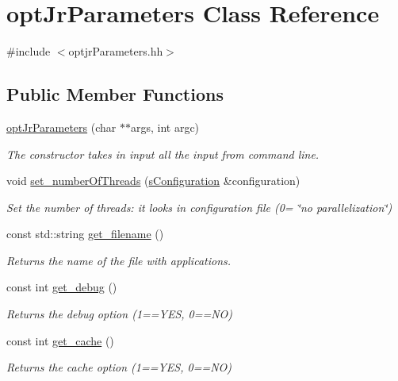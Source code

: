 \hypertarget{classoptJrParameters}{\section{opt\-Jr\-Parameters Class Reference}
\label{classoptJrParameters}
}


{\ttfamily \#include $<$optjr\-Parameters.\-hh$>$}

\subsection*{Public Member Functions}
\begin{DoxyCompactItemize}
\item 
\hyperlink{classoptJrParameters_a76f806d48141b4b4c7a215c2645011de}{opt\-Jr\-Parameters} (char $\ast$$\ast$args, int argc)
\begin{DoxyCompactList}\small\item\em The constructor takes in input all the input from command line. \end{DoxyCompactList}\item 
void \hyperlink{classoptJrParameters_a3747d78e5dd35b8b1aa1c037e9d91cf7}{set\-\_\-number\-Of\-Threads} (\hyperlink{readConfigurationFile_8hh_ab8f35b1da3261263c5e9c0e7c8921f5c}{s\-Configuration} \&configuration)
\begin{DoxyCompactList}\small\item\em Set the number of threads\-: it looks in configuration file (0= \char`\"{}no parallelization\char`\"{}) \end{DoxyCompactList}\item 
const std\-::string \hyperlink{classoptJrParameters_a8dcc738e721b3df88c2622712ed83414}{get\-\_\-filename} ()
\begin{DoxyCompactList}\small\item\em Returns the name of the file with applications. \end{DoxyCompactList}\item 
const int \hyperlink{classoptJrParameters_a64016f274261a7a7d74d8460bb7e2ee4}{get\-\_\-debug} ()
\begin{DoxyCompactList}\small\item\em Returns the debug option (1==Y\-E\-S, 0==N\-O) \end{DoxyCompactList}\item 
const int \hyperlink{classoptJrParameters_ac698812fa1177c71eb46dc61d2e5af77}{get\-\_\-cache} ()
\begin{DoxyCompactList}\small\item\em Returns the cache option (1==Y\-E\-S, 0==N\-O) \end{DoxyCompactList}\item 
$$
\end{DoxyCompactItemize}
